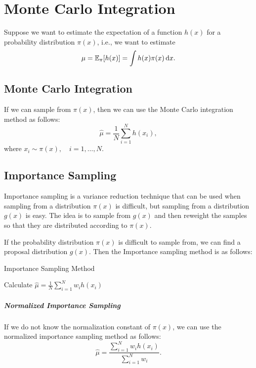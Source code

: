 \chapter{Monte Carlo Integration}

Suppose we want to estimate the expectation of a function $h(x)$ for a probability distribution $\pi(x)$, i.e., we want to estimate
\begin{equation}
	\mu={\mathbb E}_{\pi}[h(x)]=\int h(x)\pi(x)\mathop{}\!\mathrm{d} x.
\end{equation}

\section{Monte Carlo Integration}

If we can sample from $\pi(x)$, then we can use the Monte Carlo integration method as follows:
\begin{equation}
	\hat{\mu}=\frac{1}{N}\sum_{i=1}^{N}h(x_{i}),
\end{equation}
where $x_{i}\sim\pi(x),\quad i=1,\ldots,N$.

\section{Importance Sampling}

Importance sampling is a variance reduction technique that can be used when sampling from a distribution $\pi(x)$ is difficult, but sampling from a distribution $g(x)$ is easy. The idea is to sample from $g(x)$ and then reweight the samples so that they are distributed according to $\pi(x)$.

If the probability distribution $\pi(x)$ is difficult to sample from, we can find a proposal distribution $g(x)$. Then the Importance sampling method is as follows:

\begin{algorithm}[H]
	\caption{Importance Sampling Method}
	Calculate $\hat{\mu}=\frac{1}{N}\sum_{i=1}^{N}w_{i}h(x_{i})$\;
\end{algorithm}

\paragraph{Normalized Importance Sampling}

If we do not know the normalization constant of $\pi(x)$, we can use the normalized importance sampling method as follows:
\begin{equation}
	\hat{\mu}=\frac{\sum_{i=1}^{N}w_{i}h(x_{i})}{\sum_{i=1}^{N}w_{i}}.
\end{equation}
